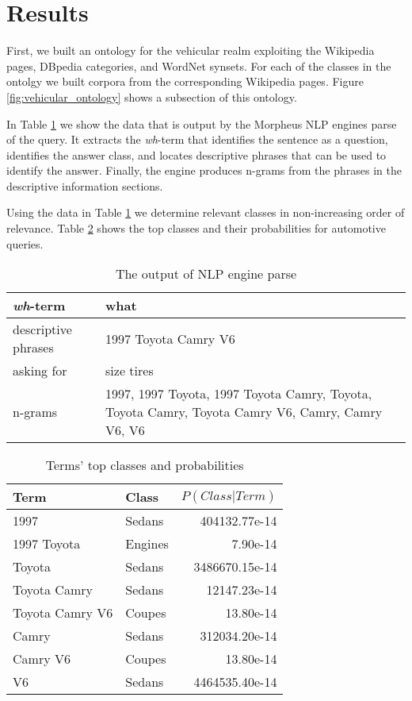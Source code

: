 \section{Results}
\label{sec:results}


First, we built an ontology for the vehicular realm exploiting the Wikipedia pages, DBpedia categories, and WordNet synsets. For each of the classes in the ontolgy we built corpora from the corresponding Wikipedia pages. Figure \ref{fig:vehicular_ontology} shows a subsection of this ontology.

In Table \ref{tbl:nlp_engine_parse} we show the data that is output by the Morpheus NLP engines parse of the query.  It extracts the \emph{wh}-term that identifies the sentence as a question, identifies the answer class, and locates descriptive phrases that can be used to identify the answer. Finally, the engine produces n-grams from the phrases in the descriptive information sections.

Using the data in Table \ref{tbl:nlp_engine_parse} we determine relevant classes in non-increasing order of relevance. Table \ref{tbl:term_classes} shows the top classes and their probabilities for automotive queries.

\begin{table}[!]\footnotesize
	\begin{tabular}{|l|p{4.2cm}|}
		\hline 
		\emph{wh}-term & what \\
		\hline 
		descriptive phrases & \small 1997 Toyota Camry V6 \\
		\hline 
		asking for & size tires \\
		\hline 
		n-grams & \small 1997, 1997 Toyota, 1997 Toyota Camry, Toyota, Toyota Camry, Toyota Camry V6, Camry, Camry V6, V6 \\
		\hline
	\end{tabular}
	\caption{The output of NLP engine parse}
	\label{tbl:nlp_engine_parse} 
\end{table}

\begin{table}[!]\footnotesize

\begin{tabular}{| p{3.2cm} | l | r |}
\hline 
Term & Class & $P(Class|Term)$ \\ \hline
1997 & Sedans & 404132.77e-14\\ 
1997 Toyota & Engines & 7.90e-14\\ 
Toyota  & Sedans & 3486670.15e-14\\ 
Toyota Camry & Sedans & 12147.23e-14\\ 
Toyota Camry V6 & Coupes & 13.80e-14\\ 
Camry & Sedans & 312034.20e-14\\ 
Camry V6 & Coupes & 13.80e-14\\ 
V6 & Sedans & 4464535.40e-14\\ \hline
\end{tabular}        

\caption{Terms' top classes and probabilities}
\label{tbl:term_classes}   

\end{table}

